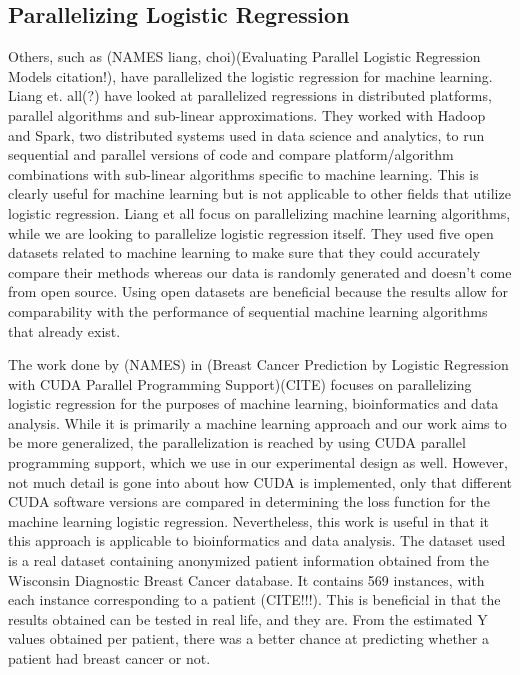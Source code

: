 \documentclass[letterpaper, 10 pt, conference]{ieeeconf}  %
\begin{document}
\subsection{Parallelizing Logistic Regression}
Others, such as (NAMES liang, choi)(Evaluating Parallel Logistic Regression Models citation!), have parallelized the logistic regression for machine learning. Liang et. all(?) have looked at parallelized regressions in distributed platforms, parallel algorithms and sub-linear approximations. They worked with Hadoop and Spark, two distributed systems used in data science and analytics, to run sequential and parallel versions of code and compare platform/algorithm combinations with sub-linear algorithms specific to machine learning. This is clearly useful for machine learning but is not applicable to other fields that utilize logistic regression. Liang et all focus on parallelizing machine learning algorithms, while we are looking to parallelize logistic regression itself. They used five open datasets related to machine learning to make sure that they could accurately compare their methods whereas our data is randomly generated and doesn’t come from open source. Using open datasets are beneficial because the results allow for comparability with the performance of sequential machine learning algorithms that already exist. 

The work done by (NAMES) in (Breast Cancer Prediction by Logistic Regression with CUDA Parallel Programming Support)(CITE) focuses on parallelizing logistic regression for the purposes of machine learning, bioinformatics and data analysis. While it is primarily a machine learning approach and our work aims to be more generalized, the parallelization is reached by using CUDA parallel programming support, which we use in our experimental design as well. However, not much detail is gone into about how CUDA is implemented, only that different CUDA software versions are compared in determining the loss function for the machine learning logistic regression. Nevertheless, this work is useful in that it this approach is applicable to bioinformatics and data analysis. The dataset used is a real dataset containing anonymized patient information obtained from the Wisconsin Diagnostic Breast Cancer database. It contains 569 instances, with each instance corresponding to a patient (CITE!!!). This is beneficial in that the results obtained can be tested in real life, and they are. From the estimated Y values obtained per patient, there was a better chance at predicting whether a patient had breast cancer or not.  
\end{document}
